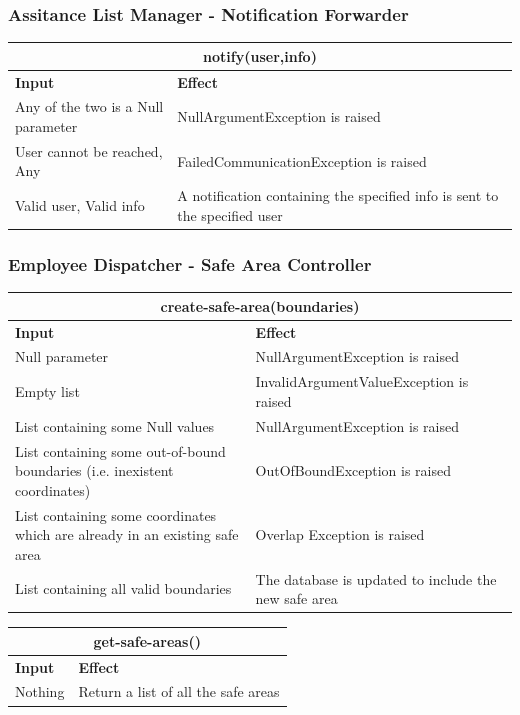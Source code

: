\documentclass{article}
\begin{document}
\subsubsection{Assitance List Manager - Notification Forwarder}
\begin{tabular}{ |p{5cm}|p{7cm}| }
  \hline
  \multicolumn{2}{|c|}{notify(user,info)} \\
  \hline
  \textbf{Input} & \textbf{Effect} \\
  \hline
   Any of the two is a Null parameter & NullArgumentException is raised\\
  \hline
 User cannot be reached, Any & FailedCommunicationException is raised\\
  \hline
  Valid user, Valid info & A notification containing the specified info is sent to the specified user\\
  \hline
\end{tabular}
\subsubsection{Employee Dispatcher - Safe Area Controller}
\begin{tabular}{ |p{5cm}|p{7cm}| }
  \hline
  \multicolumn{2}{|c|}{create-safe-area(boundaries)} \\
  \hline
  \textbf{Input} & \textbf{Effect} \\
  \hline
  Null parameter & NullArgumentException is raised\\
  \hline
  Empty list & InvalidArgumentValueException is raised\\
  \hline
  List containing some Null values & NullArgumentException is raised\\
  \hline
  List containing some out-of-bound boundaries (i.e. inexistent coordinates) & OutOfBoundException is raised\\
  \hline
  List containing some coordinates which are already in an existing safe area & Overlap Exception is raised\\
  \hline
  List containing all valid boundaries & The database is updated to include the new safe area\\
  \hline
\end{tabular}
\newline
\begin{tabular}{ |p{5cm}|p{7cm}| }
  \hline
  \multicolumn{2}{|c|}{get-safe-areas()} \\
  \hline
  \textbf{Input} & \textbf{Effect} \\
  \hline
  Nothing & Return a list of all the safe areas\\
  \hline
\end{tabular}
\end{document}
